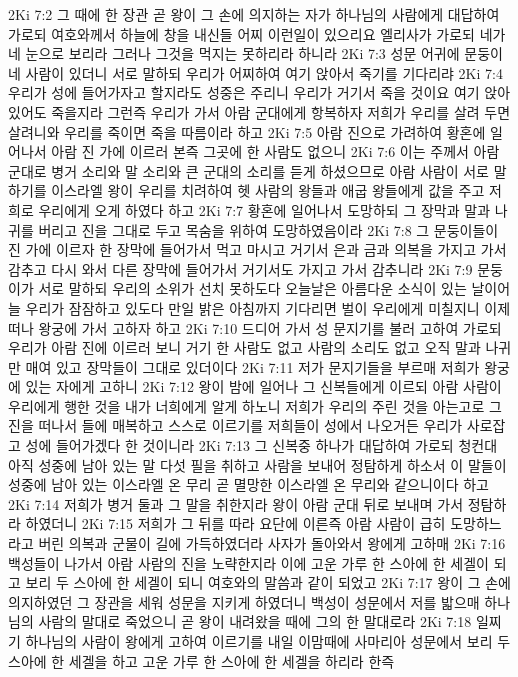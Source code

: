 2Ki 7:2  그 때에 한 장관 곧 왕이 그 손에 의지하는 자가 하나님의 사람에게 대답하여 가로되 여호와께서 하늘에 창을 내신들 어찌 이런일이 있으리요 엘리사가 가로되 네가 네 눈으로 보리라 그러나 그것을 먹지는 못하리라 하니라
2Ki 7:3  성문 어귀에 문둥이 네 사람이 있더니 서로 말하되 우리가 어찌하여 여기 앉아서 죽기를 기다리랴
2Ki 7:4  우리가 성에 들어가자고 할지라도 성중은 주리니 우리가 거기서 죽을 것이요 여기 앉아 있어도 죽을지라 그런즉 우리가 가서 아람 군대에게 항복하자 저희가 우리를 살려 두면 살려니와 우리를 죽이면 죽을 따름이라 하고
2Ki 7:5  아람 진으로 가려하여 황혼에 일어나서 아람 진 가에 이르러 본즉 그곳에 한 사람도 없으니
2Ki 7:6  이는 주께서 아람군대로 병거 소리와 말 소리와 큰 군대의 소리를 듣게 하셨으므로 아람 사람이 서로 말하기를 이스라엘 왕이 우리를 치려하여 헷 사람의 왕들과 애굽 왕들에게 값을 주고 저희로 우리에게 오게 하였다 하고
2Ki 7:7  황혼에 일어나서 도망하되 그 장막과 말과 나귀를 버리고 진을 그대로 두고 목숨을 위하여 도망하였음이라
2Ki 7:8  그 문둥이들이 진 가에 이르자 한 장막에 들어가서 먹고 마시고 거기서 은과 금과 의복을 가지고 가서 감추고 다시 와서 다른 장막에 들어가서 거기서도 가지고 가서 감추니라
2Ki 7:9  문둥이가 서로 말하되 우리의 소위가 선치 못하도다 오늘날은 아름다운 소식이 있는 날이어늘 우리가 잠잠하고 있도다 만일 밝은 아침까지 기다리면 벌이 우리에게 미칠지니 이제 떠나 왕궁에 가서 고하자 하고
2Ki 7:10  드디어 가서 성 문지기를 불러 고하여 가로되 우리가 아람 진에 이르러 보니 거기 한 사람도 없고 사람의 소리도 없고 오직 말과 나귀만 매여 있고 장막들이 그대로 있더이다
2Ki 7:11  저가 문지기들을 부르매 저희가 왕궁에 있는 자에게 고하니
2Ki 7:12  왕이 밤에 일어나 그 신복들에게 이르되 아람 사람이 우리에게 행한 것을 내가 너희에게 알게 하노니 저희가 우리의 주린 것을 아는고로 그 진을 떠나서 들에 매복하고 스스로 이르기를 저희들이 성에서 나오거든 우리가 사로잡고 성에 들어가겠다 한 것이니라
2Ki 7:13  그 신복중 하나가 대답하여 가로되 청컨대 아직 성중에 남아 있는 말 다섯 필을 취하고 사람을 보내어 정탐하게 하소서 이 말들이 성중에 남아 있는 이스라엘 온 무리 곧 멸망한 이스라엘 온 무리와 같으니이다 하고
2Ki 7:14  저희가 병거 둘과 그 말을 취한지라 왕이 아람 군대 뒤로 보내며 가서 정탐하라 하였더니
2Ki 7:15  저희가 그 뒤를 따라 요단에 이른즉 아람 사람이 급히 도망하느라고 버린 의복과 군물이 길에 가득하였더라 사자가 돌아와서 왕에게 고하매
2Ki 7:16  백성들이 나가서 아람 사람의 진을 노략한지라 이에 고운 가루 한 스아에 한 세겔이 되고 보리 두 스아에 한 세겔이 되니 여호와의 말씀과 같이 되었고
2Ki 7:17  왕이 그 손에 의지하였던 그 장관을 세워 성문을 지키게 하였더니 백성이 성문에서 저를 밟으매 하나님의 사람의 말대로 죽었으니 곧 왕이 내려왔을 때에 그의 한 말대로라
2Ki 7:18  일찌기 하나님의 사람이 왕에게 고하여 이르기를 내일 이맘때에 사마리아 성문에서 보리 두 스아에 한 세겔을 하고 고운 가루 한 스아에 한 세겔을 하리라 한즉
